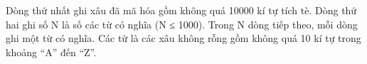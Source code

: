 Dòng thứ nhất ghi xâu đã mã hóa gồm không quá 10000 kí tự tích tè. Dòng thứ hai ghi số N là số các từ có nghĩa (N ≤ 1000). Trong N dòng tiếp theo, mỗi dòng ghi một từ có nghĩa. Các từ là các xâu không rỗng gồm không quá 10 kí tự trong khoảng “A” đến “Z”.

\